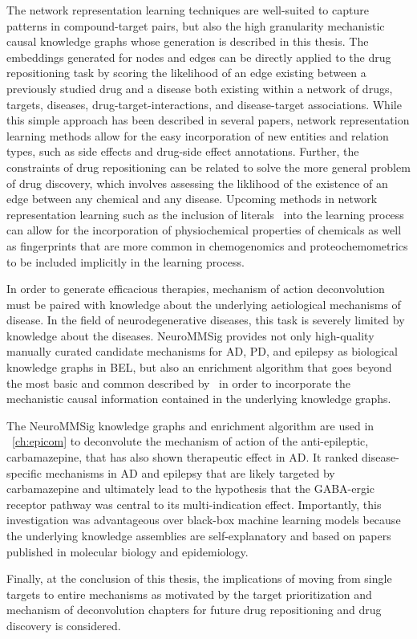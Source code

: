 The network representation learning techniques are well-suited to capture patterns in compound-target pairs, but also the high granularity mechanistic causal knowledge graphs whose generation is described in this thesis.
The embeddings generated for nodes and edges can be directly applied to the drug repositioning task by scoring the likelihood of an edge existing between a previously studied drug and a disease both existing within a network of drugs, targets, diseases, drug-target-interactions, and disease-target associations.
While this simple approach has been described in several papers, network representation learning methods allow for the easy incorporation of new entities and relation types, such as side effects and drug-side effect annotations.
Further, the constraints of drug repositioning can be related to solve the more general problem of drug discovery, which involves assessing the liklihood of the existence of an edge between any chemical and any disease.
Upcoming methods in network representation learning such as the inclusion of literals~\cite{Kristiadi2018} into the learning process can allow for the incorporation of physiochemical properties of chemicals as well as fingerprints that are more common in chemogenomics and proteochemometrics to be included implicitly in the learning process.

In order to generate efficacious therapies, mechanism of action deconvolution must be paired with knowledge about the underlying aetiological mechanisms of disease.
In the field of neurodegenerative diseases, this task is severely limited by knowledge about the diseases.
NeuroMMSig provides not only high-quality manually curated candidate mechanisms for \ac{AD}, \ac{PD}, and epilepsy as biological knowledge graphs in \ac{BEL}, but also an enrichment algorithm that goes beyond the most basic and common described by~\cite{Khatri2012} in order to incorporate the mechanistic causal information contained in the underlying knowledge graphs.

The NeuroMMSig knowledge graphs and enrichment algorithm are used in ~\autoref{ch:epicom} to deconvolute the mechanism of action of the anti-epileptic, carbamazepine, that has also shown therapeutic effect in \ac{AD}.
It ranked disease-specific mechanisms in \ac{AD} and epilepsy that are likely targeted by carbamazepine and ultimately lead to the hypothesis that the GABA-ergic receptor pathway was central to its multi-indication effect.
Importantly, this investigation was advantageous over black-box machine learning models because the underlying knowledge assemblies are self-explanatory and based on papers published in molecular biology and epidemiology.

Finally, at the conclusion of this thesis, the implications of moving from single targets to entire mechanisms as motivated by the target prioritization and mechanism of deconvolution chapters for future drug repositioning and drug discovery is considered.
